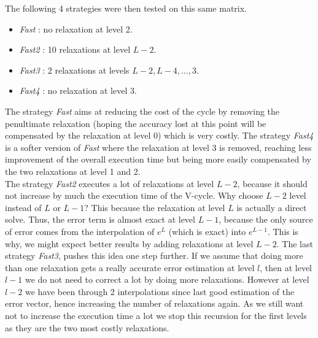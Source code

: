\documentclass[10pt,conference]{IEEEtran}
\begin{document}
 The following 4 strategies were then tested on this same matrix.
  \begin{itemize}
   \item \emph{Fast} : no relaxation at level 2.
   \item \emph{Fast2} : 10 relaxations at level $L-2$.
   \item \emph{Fast3} : 2 relaxations at levels $L-2,L-4,\dots,3$.
   \item \emph{Fast4} : no relaxation at level 3.
  \end{itemize}
  The strategy \emph{Fast} aims at reducing the cost of the cycle by removing the penultimate relaxation (hoping the accuracy lost at this point will be compensated by the relaxation at level 0) which is very costly.
  The strategy \emph{Fast4} is a softer version of \emph{Fast} where the relaxation at level 3 is removed, reaching less improvement of the overall execution time but being more easily compensated by the two relaxations at level 1 and 2.\\
  The strategy \emph{Fast2} executes a lot of relaxations at level $L-2$, because it should not increase by much the execution time of the V-cycle. Why choose $L-2$ level instead of $L$ or $L-1$?
  This because the relaxation at level $L$ is actually a direct solve. Thus, the error term is almost exact at level $L-1$, because the only source of error
  comes from the interpolation of $e^L$ (which is exact) into $e^{L-1}$. This is why, we might expect better results by adding relaxations at level $L-2$.
  The last strategy \emph{Fast3}, pushes this idea one step further. If we assume that doing more than one relaxation gets a really accurate error estimation at level $l$, then
  at level $l-1$ we do not need to correct a lot by doing more relaxations. However at level $l-2$ we have been through 2 interpolations since last good estimation of the error vector, hence increasing the number of relaxations again.
  As we still want not to increase the execution time a lot we stop this recursion for the first levels as they are the two most costly relaxations.
  
\end{document}
